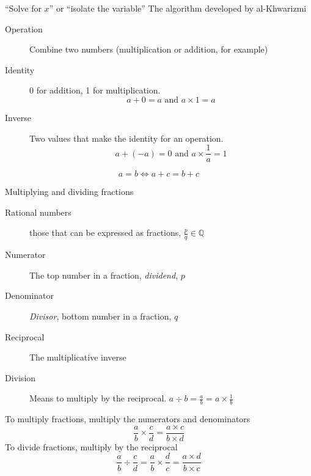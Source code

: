 \documentclass[onlytextwidth, aspectratio=169]{beamer}
\begin{document}
\begin{frame}{``Solve for $x$'' or ``isolate the variable''}
  {The algorithm developed by al-Khwarizmi}
  \begin{description}
    \item[Operation] Combine two numbers (multiplication or addition, for example)
    \item[Identity] 0 for addition, 1 for multiplication. 
      $$a+0=a \text{ and } a \times 1 = a$$
    \item[Inverse] Two values that make the identity for an operation. 
      $$a + (-a)=0 \text{ and } a \times \frac{1}{a}=1$$
  \end{description}
  $$a = b \Longleftrightarrow a+c = b+c$$
\end{frame}

\begin{frame}{Multiplying and dividing fractions}
  \begin{description}
    \item[Rational numbers] those that can be expressed as fractions, $\displaystyle \frac{p}{q} \in \mathbb{Q}$
    \item[Numerator] The top number in a fraction, \emph{dividend}, $p$
    \item[Denominator] \emph{Divisor}, bottom number in a fraction, $q$
    \item[Reciprocal] The multiplicative inverse
    \item[Division] Means to multiply by the reciprocal. $a \div b = \frac{a}{b} = a \times \frac{1}{b}$
  \end{description}
  To multiply fractions, multiply the numerators and denominators
  $$\frac{a}{b} \times \frac{c}{d} =\frac{a \times c}{b\times d}  $$
  To divide fractions, multiply by the reciprocal
  $$\frac{a}{b} \div \frac{c}{d} = \frac{a}{b} \times \frac{d}{c} = \frac{a \times d}{b\times c}  $$
  \end{frame}
\end{document}
